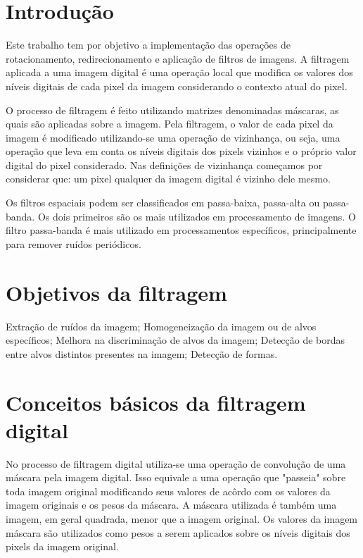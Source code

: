 \newpage
\section{Introdução}
Este trabalho tem por objetivo a implementação das operações de rotacionamento, redirecionamento e aplicação de filtros de imagens. A filtragem aplicada a uma imagem digital é uma operação local que modifica os valores dos níveis digitais de cada pixel da imagem considerando o contexto atual do pixel.

O processo de filtragem é feito utilizando matrizes denominadas máscaras, as quais são aplicadas sobre a imagem. Pela filtragem, o valor de cada pixel da imagem é modificado utilizando-se uma operação de vizinhança, ou seja, uma operação que leva em conta os níveis digitais dos pixels vizinhos e o próprio valor digital do pixel considerado. Nas definições de vizinhança começamos por considerar que: um pixel qualquer da imagem digital é vizinho dele mesmo.

Os filtros espaciais podem ser classificados em passa-baixa, passa-alta ou passa-banda. Os dois primeiros são os mais utilizados em processamento de imagens. O filtro passa-banda é mais utilizado em processamentos específicos, principalmente para remover ruídos periódicos.

\section{Objetivos da filtragem}
Extração de ruídos da imagem;
Homogeneização da imagem ou de alvos específicos;
Melhora na discriminação de alvos da imagem;
Detecção de bordas entre alvos distintos presentes na imagem;
Detecção de formas.

\section{Conceitos básicos da filtragem digital}
No processo de filtragem digital utiliza-se uma operação de convolução de uma máscara pela imagem digital. Isso equivale a uma operação que "passeia" sobre toda imagem original modificando seus valores de acôrdo com os valores da imagem originais e os pesos da máscara.
A máscara utilizada é também uma imagem, em geral quadrada, menor que a imagem original. Os valores da imagem máscara são utilizados como pesos a serem aplicados sobre os níveis digitais dos pixels da imagem original.